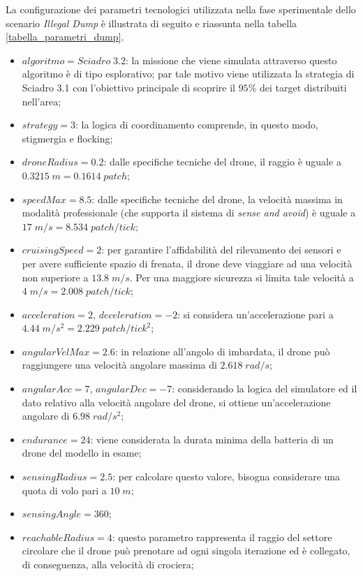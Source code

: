 La configurazione dei parametri tecnologici utilizzata nella fase sperimentale dello scenario \textit{Illegal Dump} è illustrata di seguito e riassunta nella tabella \ref{tabella_parametri_dump}.

\begin{itemize}
    \item $algoritmo = Sciadro \; 3.2$: la missione che viene simulata attraverso questo algoritmo è di tipo esplorativo; par tale motivo viene utilizzata la strategia di Sciadro 3.1 con l'obiettivo principale di scoprire il $95 \%$ dei target distribuiti nell'area;
    \item $strategy = 3$: la logica di coordinamento comprende, in questo modo, stigmergia e flocking;
    \item $droneRadius = 0.2$: dalle specifiche tecniche del drone, il raggio è uguale a $0.3215 \; m = 0.1614 \; patch$;
    \item $speedMax = 8.5$: dalle specifiche tecniche del drone, la velocità massima in modalità professionale (che supporta il sistema di \textit{sense and avoid}) è uguale a $17 \; m/s = 8.534 \; patch/tick$;
    \item $cruisingSpeed = 2$: per garantire l'affidabilità del rilevamento dei sensori e per avere sufficiente spazio di frenata, il drone deve viaggiare ad una velocità non superiore a $13.8 \; m/s$. Per una maggiore sicurezza si limita tale velocità a $4 \; m/s = 2.008 \; patch/tick$;
    \item $acceleration = 2$, $deceleration = -2$: si considera un'accelerazione pari a $4.44 \; m/s^{2} = 2.229 \; patch/tick^{2}$;
    \item $angularVelMax = 2.6$: in relazione all'angolo di imbardata, il drone può raggiungere una velocità angolare massima di $2.618 \; rad/s$;
    \item $angularAcc = 7$, $angularDec = -7$: considerando la logica del simulatore ed il dato relativo alla velocità angolare del drone, si ottiene un'accelerazione angolare di $6.98 \; rad/s^{2}$;
    \item $endurance = 24$: viene considerata la durata minima della batteria di un drone del modello in esame;
    \item $sensingRadius = 2.5$: per calcolare questo valore, bisogna considerare una quota di volo pari a $10 \; m$;
    \item $sensingAngle = 360$;
    \item $reachableRadius = 4$: questo parametro rappresenta il raggio del settore circolare che il drone può prenotare ad ogni singola iterazione ed è collegato, di conseguenza, alla velocità di crociera;

\end{itemize}
